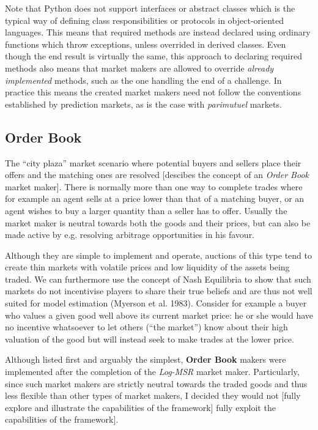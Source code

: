 \documentclass[bsc,frontabs,twoside,singlespacing,parskip,deptreport]{infthesis}     %
\begin{document}
	 Note that Python does not support interfaces or abstract classes which is the typical way of defining class responsibilities or protocols in object-oriented languages. This means that required methods are instead declared using ordinary functions which throw exceptions, unless overrided in derived classes. Even though the end result is virtually the same, this approach to declaring required methods also means that market makers are allowed to override {\it already implemented} methods, such as the one handling the end of a challenge. In practice this means the created market makers need not follow the conventions established by prediction markets, as is the case with {\it parimutuel} markets. 


\subsection{Order Book}
    
    The “city plaza” market scenario where potential buyers and sellers place their offers and the matching ones are resolved [descibes the concept of an {\em Order Book} market maker]. There is normally more than one way to complete trades where for example an agent sells at a price lower than that of a matching buyer, or an agent wishes to buy a larger quantity than a seller has to offer. Usually the market maker is neutral towards both the goods and their prices, but can also be made active by e.g. resolving arbitrage opportunities in his favour.

    Although they are simple to implement and operate, auctions of this type tend to create thin markets with volatile prices and low liquidity of the assets being traded. We can furthermore use the concept of Nash Equilibria to show that such markets do not incentivise players to share their true beliefs and are thus not well suited for model estimation (Myerson et al. 1983). Consider for example a buyer who values a given good well above its current market price: he or she would have no incentive whatsoever to let others (“the market”) know about their high valuation of the good but will instead seek to make trades at the lower price.

	Although listed first and arguably the simplest, {\bf Order Book} makers were implemented after the completion of the {\em Log-MSR} market maker. Particularly, since such market makers are strictly neutral towards the traded goods and thus less flexible than other types of market makers, I decided they would not [fully explore and illustrate the capabilities of the framework] fully exploit the capabilities of the framework]. 
\end{document}
